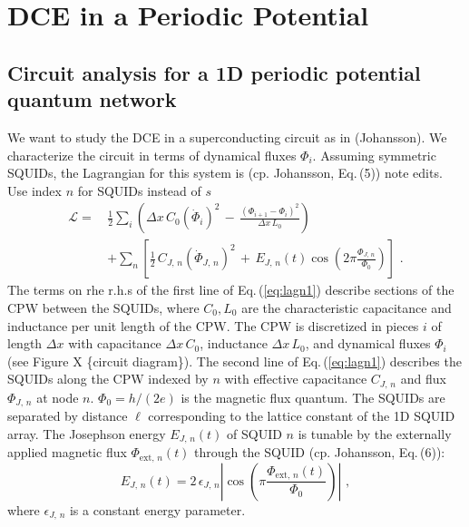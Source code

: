 \chapter{DCE in a Periodic Potential} \label{ch:system}


\section{Circuit analysis for a 1D periodic potential quantum network}\label{sec:circ_an}
We want to study the DCE in a superconducting circuit as in (Johansson). We characterize the circuit in terms of dynamical fluxes $\Phi_i$. \color{blue} Assuming symmetric SQUIDs, the Lagrangian for this system is (cp. Johansson, Eq.\,(5))
\color{red} note edits. Use index $n$ for SQUIDs instead of $s$ \color{blue}
%
\begin{equation} \label{eq:lagn1}
\begin{split}
\mathcal{L} = \, & \frac{1}{2} \sum_i \left( \Delta x \, C_{0} \left(\dot{\Phi}_{i}\right)^{2} \, - \, 
\frac{\left(\Phi_{i+1}-\Phi_{i}\right)^{2}}{\Delta x \, L_{0}} \right)  \\[2mm]
& + \sum_n \left[ \frac{1}{2} \, C_{J,\,n} \left(\dot{\Phi}_{J,\,n} \right)^{2} \, + \, 
E_{J,\,n}(t) \cos\left(2\pi \frac{\Phi_{J,\,n}}{\Phi_0} \right) \right] \, \, .
\end{split}
\end{equation}
%
The terms on rhe r.h.s of the first line of Eq.\,(\ref{eq:lagn1}) describe sections of the CPW between the SQUIDs, where
$C_0, L_0$ are the characteristic capacitance and inductance per unit length of the CPW. 
The CPW is discretized in pieces $i$ of length $\Delta x$ with capacitance $\Delta x \, C_0$, 
inductance $\Delta x \, L_0$, and dynamical fluxes $\Phi_i$ \color{red}(see Figure X \{circuit diagram\})\color{blue}.   
The second line of Eq.\,(\ref{eq:lagn1}) describes the SQUIDs along the CPW indexed by $n$ 
with effective capacitance $C_{J,\,n}$ and flux $\Phi_{J,\,n}$ at node $n$. 
$\Phi_0 = h / (2 e)$ is the magnetic flux quantum.
The SQUIDs are separated by 
distance $\ell$ corresponding to the lattice constant of the 1D SQUID array. 
The Josephson energy $E_{J,\,n}(t)$ of SQUID $n$ is tunable
by the externally applied magnetic flux $\Phi_{\text{ext},\,n}(t)$ through the SQUID 
(cp. Johansson, Eq.\,(6)): 
%
\begin{equation} \label{eq:squidenergy}
    E_{J,\,n}(t) = 2 \, \epsilon_{J,\,n} 
    \left\vert \cos\left(\pi \frac{\Phi_{\text{ext},\,n}(t)}{\Phi_0}\right)\right\vert \, \, ,
\end{equation}
%
where $\epsilon_{J,\,n}$ is a constant energy parameter.

